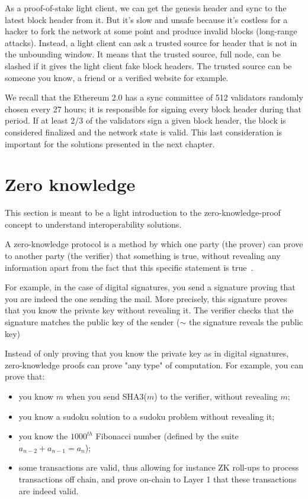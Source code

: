 As a proof-of-stake light client, we can get the genesis header and sync to the latest block header from it. But it's slow and unsafe because it's costless for a hacker to fork the network at some point and produce invalid blocks (long-range attacks). 
Instead, a light client can ask a trusted source for header that is not in the unbounding window. It means that the trusted source, full node, can be slashed if it gives the light client fake block headers. The trusted source can be someone you know, a friend or a verified website for example.

We recall that the Ethereum 2.0 has a sync committee of 512 validators randomly chosen every 27 hours; it is responsible for signing every block header during that period. If at least 2/3 of the validators sign a given block header, the block is considered finalized and the network state is valid. 
This last consideration is important for the solutions presented in the next chapter.


\section{Zero knowledge}
\label{zeroknowledge}
This section is meant to be a light introduction to the zero-knowledge-proof concept to understand interoperability solutions. 

A zero-knowledge protocol is a method by which one party (the prover) can prove to another party (the verifier) that something is true, without revealing any information apart from the fact that this specific statement is true~\cite{Goldwasser}.

For example, in the case of digital signatures, you send a signature proving that you are indeed the one sending the mail. More precisely, this signature proves that you know the private key without revealing it. The verifier checks that the signature matches the public key of the sender ($\sim$ the signature reveals the public key)

Instead of only proving that you know the private key as in digital signatures, zero-knowledge proofs can prove "any type" of computation. For example, you can prove that: 
\begin{itemize}
    \item you know $m$ when you send SHA3($m$) to the verifier, without revealing $m$; 
    \item you know a sudoku solution to a sudoku problem without revealing it;
    \item you know the $1000^{th}$ Fibonacci number (defined by the suite $a_{n-2}+a_{n-1}=a_n$);
    \item some transactions are valid, thus allowing for instance ZK roll-ups to process transactions off chain, and prove on-chain to Layer 1 that these transactions are indeed valid. 
\end{itemize}

